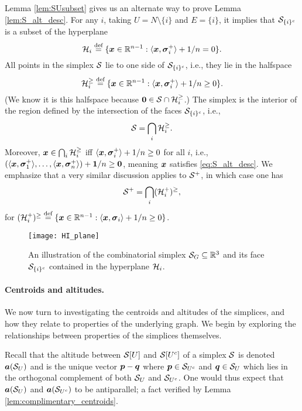 Lemma \ref{lem:SUsubset} gives us an alternate way to prove Lemma \ref{lem:S_alt_desc}. For any $i$,  taking $U=N\setminus \{i\}$ and $E=\{i\}$, it implies that $\mathcal{S}_{\{i\}^c}$ is a subset of the hyperplane 
\begin{equation}
\label{eq:Hi}
 \mathcal{H}_i\overset{\text{def}}{=} \{\vb*{x}\in\mathbb{R}^{n-1}:\langle \vb*{x},\vb*{\sigma}_i^+\rangle+1/n=0\}.
\end{equation}
All points in the simplex $\mathcal{S}$ lie to one side of $\mathcal{S}_{\{i\}^c}$, i.e., they lie in the halfspace 
\[\mathcal{H}_i^{\geq } \overset{\text{def}}{=} \{\vb*{x}\in\mathbb{R}^{n-1}:\langle \vb*{x},\vb*{\sigma}_i^+\rangle+1/n\geq0\}.\]
(We know it is this halfspace because $\vb{0}\in\mathcal{S}\cap\mathcal{H}_i^{\geq }$.) The simplex is the interior of the region defined by the intersection of the faces $\mathcal{S}_{\{i\}^c}$, i.e.,   
\begin{equation}
\label{eq:splx_bigcapH_i}
    \mathcal{S}=\bigcap_i \mathcal{H}_i^{\geq }.
\end{equation}
Moreover, $\vb*{x}\in \bigcap_i\mathcal{H}_i^{\geq }$ iff $\langle \vb*{x},\vb*{\sigma}_i^+\rangle +1/n\geq 0$ for all $i$, i.e., $(\langle \vb*{x},\vb*{\sigma}_1^+\rangle,\dots,\langle \vb*{x},\vb*{\sigma}_n^+\rangle) + \vb{1}/n\geq \vb{0}$, meaning $\vb*{x}$ satisfies \eqref{eq:S_alt_desc}.  We emphasize that a very similar discussion applies to $\mathcal{S}^+$, in which case one has 
\begin{equation}
\label{eq:splx^+_bigcapH_i}
\mathcal{S}^+=\bigcap_i (\mathcal{H}_i^+)^{\geq },
\end{equation}
for $(\mathcal{H}_i^+)^{\geq } \overset{\text{def}}{=} \{\vb*{x}\in\mathbb{R}^{n-1}:\langle \vb*{x},\vb*{\sigma}_i\rangle + 1/n\geq 0\}$. 

\begin{figure}
	\centering
	\texttt{[image: HI\_plane]}
	\caption{An illustration of the combinatorial simplex $\mathcal{S}_G\subseteq\mathbb{R}^3$ and its face $\mathcal{S}_{\{i\}^c}$ contained in the hyperplane $\mathcal{H}_i$. }
	\label{fig:Hi_plane}
\end{figure}


\paragraph{Centroids and altitudes.} 
We now turn to investigating the centroids and altitudes of the simplices, and how they relate to properties of the underlying graph. We begin by exploring the relationships between properties of the simplices themselves. 

Recall that the altitude between $\mathcal{S}[U]$ and $\mathcal{S}[U^c]$ of a simplex $\mathcal{S}$ is denoted $\vb*{a}(\mathcal{S}_U)$ and is the unique vector $\vb*{p}-\vb*{q}$ where  $\vb*{p}\in \mathcal{S}_{U^c}$ and $\vb*{q}\in\mathcal{S}_{U}$ which lies in the orthogonal complement of both $\mathcal{S}_U$ and $\mathcal{S}_{U^c}$. One would thus expect that $\vb*{a}(\mathcal{S}_U)$ and $\vb*{a}(\mathcal{S}_{U^c})$ to be antiparallel; a fact verified by Lemma \ref{lem:complimentary_centroids}.  

